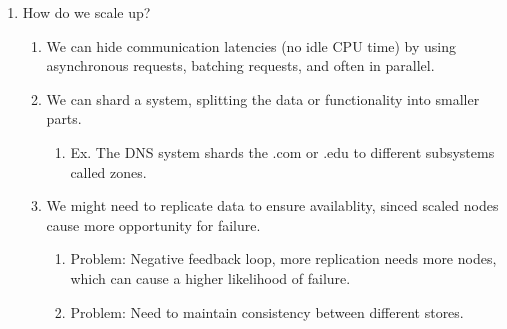 \documentclass[11pt]{article}
\begin{document}
\begin{enumerate}
\item How do we scale up?
\label{sec-1-1-3-4}
\begin{enumerate}
\item We can hide communication latencies (no idle CPU time) by using asynchronous requests, batching requests, and often in parallel.
\label{sec-1-1-3-4-1}
\item We can shard a system, splitting the data or functionality into smaller parts.
\label{sec-1-1-3-4-2}
\begin{enumerate}
\item Ex. The DNS system shards the .com or .edu to different subsystems called zones.
\label{sec-1-1-3-4-2-1}
\end{enumerate}
\item We might need to replicate data to ensure availablity, sinced scaled nodes cause more opportunity for failure.
\label{sec-1-1-3-4-3}
\begin{enumerate}
\item Problem: Negative feedback loop, more replication needs more nodes, which can cause a higher likelihood of failure.
\label{sec-1-1-3-4-3-1}
\item Problem: Need to maintain consistency between different stores.
\label{sec-1-1-3-4-3-2}
\end{enumerate}
\end{enumerate}
\end{enumerate}
\end{document}
